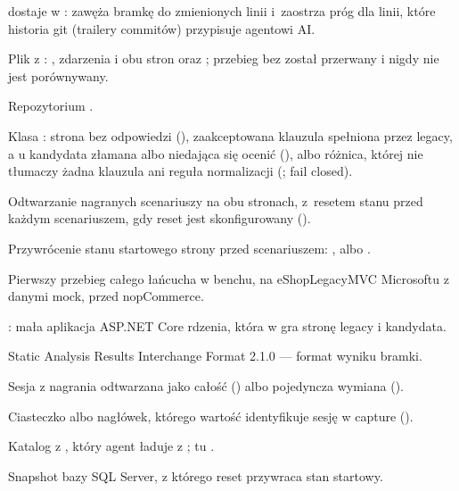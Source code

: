 \begin{description}[style=nextline, leftmargin=1.2em, font=\normalfont\bfseries]
        dostaje w : zawęża bramkę do zmienionych linii
        i~zaostrza próg dla linii, które historia git (trailery commitów) przypisuje
        agentowi AI.
  \item[przebieg] Plik  z : ,
        zdarzenia  i  obu stron oraz
        ; przebieg bez  został przerwany i nigdy nie jest
        porównywany.
  \item[rdzeń] Repozytorium .
  \item[regression] Klasa : strona bez odpowiedzi
        (), zaakceptowana klauzula spełniona przez legacy, a u
        kandydata złamana albo niedająca się ocenić (), albo
        różnica, której nie tłumaczy żadna klauzula ani reguła normalizacji
        (; fail closed).
  \item[replay] Odtwarzanie nagranych scenariuszy na obu stronach, z~resetem stanu przed
        każdym scenariuszem, gdy reset jest skonfigurowany ().
  \item[reset stanu] Przywrócenie stanu startowego strony przed scenariuszem:
        ,  albo .
  \item[rozgrzewka (P3)] Pierwszy przebieg całego łańcucha w benchu, na eShopLegacyMVC
        Microsoftu z danymi mock, przed nopCommerce.
  \item[sample shop] : mała aplikacja ASP.NET Core rdzenia, która
        w  gra stronę legacy i kandydata.
  \item[SARIF] Static Analysis Results Interchange Format 2.1.0 --- format wyniku bramki.
  \item[scenariusz] Sesja z nagrania odtwarzana jako całość () albo
        pojedyncza wymiana ().
  \item[session key] Ciasteczko albo nagłówek, którego wartość identyfikuje sesję w
        capture ().
  \item[skill] Katalog z , który agent ładuje z
        ; tu .
  \item[snapshot] Snapshot bazy SQL Server, z którego reset przywraca stan startowy.

\end{description}
